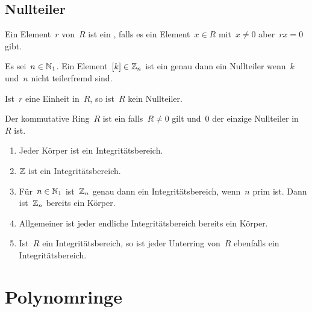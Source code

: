 \subsection{Nullteiler}

\begin{definition}
  Ein Element~$r$ von~$R$ ist ein , falls es ein Element~$x \in R$ mit~$x \neq 0$ aber~$rx = 0$ gibt.
\end{definition}

\begin{example}
  Es sei~$n \in \mathbb{N}_1$.
  Ein Element~$[k] \in \mathbb{Z}_n$ ist ein genau dann ein Nullteiler wenn~$k$ und~$n$ nicht teilerfremd sind.
\end{example}

\begin{proposition}
  Ist~$r$ eine Einheit in~$R$, so ist~$R$ kein Nullteiler.
\end{proposition}

\begin{definition}
  Der kommutative Ring~$R$ ist ein  falls~$R \neq 0$ gilt und~$0$ der einzige Nullteiler in~$R$ ist.
\end{definition}

\begin{example}
  \leavevmode
  \begin{enumerate}
    \item
      Jeder Körper ist ein Integritätsbereich.
    \item
      $\mathbb{Z}$ ist ein Integritätsbereich.
    \item
      Für~$n \in \mathbb{N}_1$ ist~$\mathbb{Z}_n$ genau dann ein Integritätsbereich, wenn~$n$ prim ist.
      Dann ist~$\mathbb{Z}_n$ bereits ein Körper.
    \item
      Allgemeiner ist jeder endliche Integritätsbereich bereits ein Körper.
    \item
      Ist~$R$ ein Integritätsbereich, so ist jeder Unterring von~$R$ ebenfalls ein Integritätsbereich.
  \end{enumerate}
\end{example}





\section{Polynomringe}

